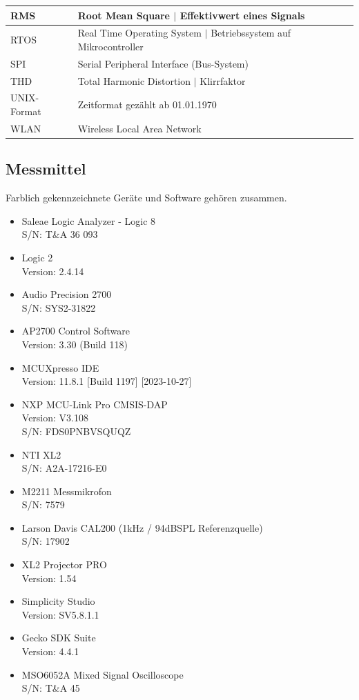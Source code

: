 \documentclass[12pt]{article}
\begin{document}
\begin{table}[H]
\begin{tabular}{|l|p{}|}
			RMS & Root Mean Square $\vert$ Effektivwert eines Signals \\ \hline
			RTOS & Real Time Operating System $\vert$ Betriebssystem auf Mikro\-controller \\ \hline
			SPI & Serial Peripheral Interface (Bus-System) \\ \hline
			THD & Total Harmonic Distortion $\vert$ Klirrfaktor \\ \hline
			UNIX-Format & Zeitformat gezählt ab 01.01.1970 \\ \hline
			WLAN & Wireless Local Area Network \\ \hline
		\end{tabular}
	\end{table}
	
	\newpage
	\subsection*{Messmittel} \label{Messmittel}
	Farblich gekennzeichnete Geräte und Software gehören zusammen.
\begin{itemize}
	\color{green}
	\item Saleae Logic Analyzer - Logic 8 \\
	S/N: T\&A 36 093
	\item Logic 2 \\
	Version: 2.4.14
	\color{red}
	\item Audio Precision 2700 \\
	S/N: SYS2-31822
	\item AP2700 Control Software \\
	Version: 3.30 (Build 118)
	\color{blue}
	\item MCUXpresso IDE\\
	Version: 11.8.1 [Build 1197] [2023-10-27]
	\item NXP MCU-Link Pro CMSIS-DAP \\
	Version: V3.108 \\
	S/N: FDS0PNBVSQUQZ
	\color{brown}
	\item NTI XL2 \\
	S/N: A2A-17216-E0
	\item M2211 Messmikrofon \\
	S/N: 7579
	\item Larson Davis CAL200 (1kHz / 94dBSPL Referenzquelle)\\
	S/N: 17902
	\item XL2 Projector PRO\\
	Version: 1.54
	\color{orange}
	\item Simplicity Studio \\
	Version: SV5.8.1.1
	\item Gecko SDK Suite \\
	Version: 4.4.1
	\color{black}
	\item MSO6052A Mixed Signal Oscilloscope \\
	S/N: T\&A 45
	\end{itemize}
	
\end{document}
